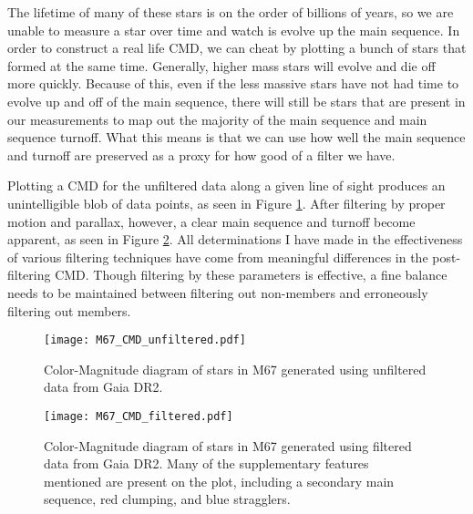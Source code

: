 \documentclass[aps,prb,twocolumn,groupedaddress,nofootinbib,floatfix]{revtex4-1}
\begin{document}
The lifetime of many of these stars is on the order of billions of years, so we are unable to measure a star over time and watch is evolve up the main sequence. In order to construct a real life CMD, we can cheat by plotting a bunch of stars that formed at the same time. Generally, higher mass stars will evolve and die off more quickly. Because of this, even if the less massive stars have not had time to evolve up and off of the main sequence, there will still be stars that are present in our measurements to map out the majority of the main sequence and main sequence turnoff. What this means is that we can use how well the main sequence and turnoff are preserved as a proxy for how good of a filter we have.

Plotting a CMD for the unfiltered data along a given line of sight produces an unintelligible blob of data points, as seen in Figure \ref{fig:M67_CMD_unfiltered}. After filtering by proper motion and parallax, however, a clear main sequence and turnoff become apparent, as seen in Figure \ref{fig:M67_CMD_filtered}. All determinations I have made in the effectiveness of various filtering techniques have come from meaningful differences in the post-filtering CMD. Though filtering by these parameters is effective, a fine balance needs to be maintained between filtering out non-members and erroneously filtering out members.

\begin{figure}[!h]
	\centering
      \texttt{[image: M67\_CMD\_unfiltered.pdf]}
	\caption{Color-Magnitude diagram of stars in M67 generated using unfiltered data from Gaia DR2.}
	\label{fig:M67_CMD_unfiltered}
\end{figure}

\begin{figure}[!h]
	\centering
      \texttt{[image: M67\_CMD\_filtered.pdf]}
	\caption{Color-Magnitude diagram of stars in M67 generated using filtered data from Gaia DR2. Many of the supplementary features mentioned are present on the plot, including a secondary main sequence, red clumping, and blue stragglers.}
	\label{fig:M67_CMD_filtered}
\end{figure}
\end{document}

